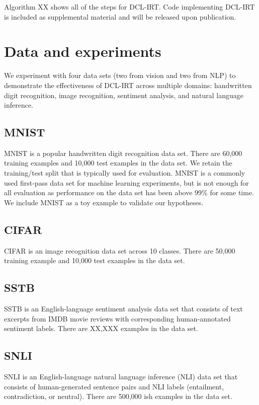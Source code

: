 \documentclass[letterpaper]{article} %
\begin{document}
Algorithm XX shows all of the steps for DCL-IRT. Code implementing DCL-IRT is included as supplemental material and will be released upon publication. 


\section{Data and experiments} 

We experiment with four data sets (two from vision and two from NLP) to demonstrate the effectiveness of DCL-IRT across multiple domains: handwritten digit recognition, image recognition, sentiment analysis, and natural language inference.

\subsection{MNIST}

MNIST is a popular handwritten digit recognition data set.
There are 60,000 training examples and 10,000 test examples in the data set.
We retain the training/test split that is typically used for evaluation.
MNIST is a commonly used first-pass data set for machine learning experiments, but is not enough for all evaluation as performance on the data set has been above 99\% for some time.
We include MNIST as a toy example to validate our hypotheses.

\subsection{CIFAR} 

CIFAR is an image recognition data set across 10 classes.
There are 50,000 training example and 10,000 test examples in the data set.

\subsection{SSTB} 

SSTB is an English-language sentiment analysis data set that consists of text excerpts from IMDB movie reviews with corresponding human-annotated sentiment labels.
There are XX,XXX examples in the data set.

\subsection{SNLI} 

SNLI is an English-language natural language inference (NLI) data set that consists of human-generated sentence pairs and NLI labels (entailment, contradiction, or neutral).
There are 500,000 ish examples in the data set.
\end{document}
